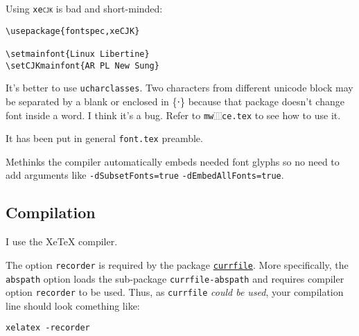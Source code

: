 Using \texttt{xe\textsc{cjk}} is bad and short-minded:
\begin{lstlisting}
\usepackage{fontspec,xeCJK}

\setmainfont{Linux Libertine}
\setCJKmainfont{AR PL New Sung}
\end{lstlisting}

It's better to use \texttt{ucharclasses}. Two characters from different unicode block may be separated by a blank or enclosed in \{⋅\} because that package doesn't change font inside a word. I think it's a bug. Refer to \texttt{mw⿲ce.tex} to see how to use it.

It has been put in general \texttt{font.tex} preamble.

Methinks the compiler automatically embeds needed font glyphs so no need to add arguments like \texttt{-dSubsetFonts=true} \texttt{-dEmbedAllFonts=true}.

\subsection{Compilation}

I use the Xe\TeX{} compiler.

The option \texttt{recorder} is required by the package \href{http://www.ctan.org/tex-archive/macros/latex/contrib/currfile}{\texttt{currfile}}. More specifically, the \texttt{abspath} option loads the sub-package \texttt{currfile-abspath} and requires compiler option \texttt{recorder} to be used. Thus, as \texttt{currfile} \textsl{could be used}, your compilation line should look comething like:

\begin{lstlisting}
xelatex -recorder
\end{lstlisting}
